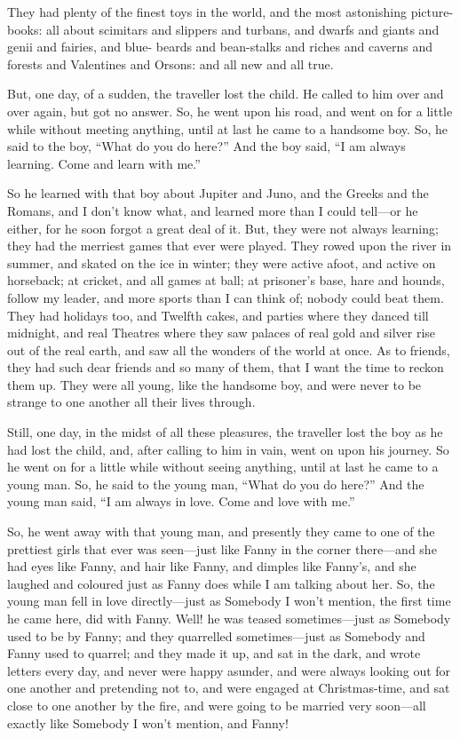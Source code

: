 They had plenty of the finest toys in the world, and the most
astonishing picture-books:  all about scimitars and slippers and
turbans, and dwarfs and giants and genii and fairies, and blue-%
beards and bean-stalks and riches and caverns and forests and
Valentines and Orsons:  and all new and all true.

But, one day, of a sudden, the traveller lost the child.  He called
to him over and over again, but got no answer.  So, he went upon his
road, and went on for a little while without meeting anything, until
at last he came to a handsome boy.  So, he said to the boy, ``What do
you do here?''  And the boy said, ``I am always learning.  Come and
learn with me.''

So he learned with that boy about Jupiter and Juno, and the Greeks
and the Romans, and I don't know what, and learned more than I could
tell---or he either, for he soon forgot a great deal of it.  But,
they were not always learning; they had the merriest games that ever
were played.  They rowed upon the river in summer, and skated on the
ice in winter; they were active afoot, and active on horseback; at
cricket, and all games at ball; at prisoner's base, hare and hounds,
follow my leader, and more sports than I can think of; nobody could
beat them.  They had holidays too, and Twelfth cakes, and parties
where they danced till midnight, and real Theatres where they saw
palaces of real gold and silver rise out of the real earth, and saw
all the wonders of the world at once.  As to friends, they had such
dear friends and so many of them, that I want the time to reckon
them up.  They were all young, like the handsome boy, and were never
to be strange to one another all their lives through.

Still, one day, in the midst of all these pleasures, the traveller
lost the boy as he had lost the child, and, after calling to him in
vain, went on upon his journey.  So he went on for a little while
without seeing anything, until at last he came to a young man.  So,
he said to the young man, ``What do you do here?''  And the young man
said, ``I am always in love.  Come and love with me.''

So, he went away with that young man, and presently they came to one
of the prettiest girls that ever was seen---just like Fanny in the
corner there---and she had eyes like Fanny, and hair like Fanny, and
dimples like Fanny's, and she laughed and coloured just as Fanny
does while I am talking about her.  So, the young man fell in love
directly---just as Somebody I won't mention, the first time he came
here, did with Fanny.  Well! he was teased sometimes---just as
Somebody used to be by Fanny; and they quarrelled sometimes---just as
Somebody and Fanny used to quarrel; and they made it up, and sat in
the dark, and wrote letters every day, and never were happy asunder,
and were always looking out for one another and pretending not to,
and were engaged at Christmas-time, and sat close to one another by
the fire, and were going to be married very soon---all exactly like
Somebody I won't mention, and Fanny!

